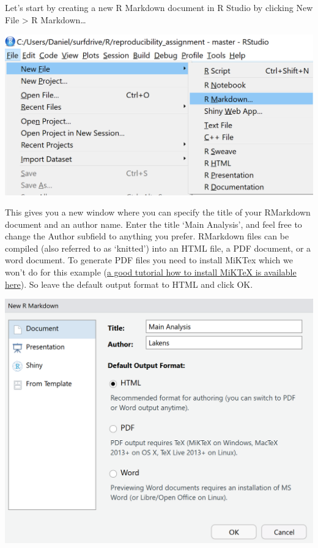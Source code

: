 \documentclass[
  oneside]{krantz}
\begin{document}
Let's start by creating a new R Markdown document in R Studio by clicking New
File \textgreater{} R Markdown\ldots{}

\begin{center}\includegraphics[width=1\linewidth]{images/f13fad91521fb984d12577416fa1fa99} \end{center}

This gives you a new window where you can specify the title of your RMarkdown
document and an author name. Enter the title `Main Analysis', and feel free to
change the Author subfield to anything you prefer. RMarkdown files can be
compiled (also referred to as `knitted') into an HTML file, a PDF document, or a
word document. To generate PDF files you need to install MiKTex which we won't
do for this example (\href{https://medium.com/@sorenlind/create-pdf-reports-using-r-r-markdown-latex-and-knitr-on-windows-10-952b0c48bfa9}{a good tutorial how to install MiKTeX is available
here}).
So leave the default output format to HTML and click OK.

\begin{center}\includegraphics[width=1\linewidth]{images/be373a55333121dee2669025ba9fff3d} \end{center}
\end{document}
